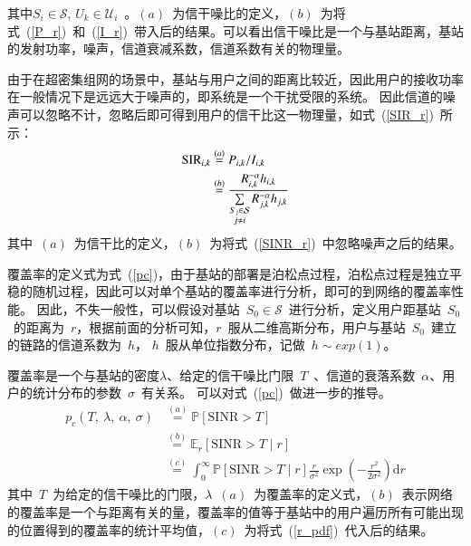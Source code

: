 其中$S_i\in\mathcal{S}$, $U_k\in\mathcal{U}_i$~。$(a)$~为信干噪比的定义，$(b)$~为将式~(\ref{P_r})~和~(\ref{I_r})~带入后的结果。可以看出信干噪比是一个与基站距离，基站的发射功率，噪声，信道衰减系数，信道系数有关的物理量。

由于在超密集组网的场景中，基站与用户之间的距离比较近，因此用户的接收功率在一般情况下是远远大于噪声的，即系统是一个干扰受限的系统。
因此信道的噪声可以忽略不计，忽略后即可得到用户的信干比这一物理量，如式~(\ref{SIR_r})~所示：
\begin{equation}\label{SIR_r}
  \begin{aligned}
    \mathrm{SIR}_{i, k}&\overset{(a)}{=}P_{i,k} / I_{i,k} \\
                 &\overset{(b)}{=}\frac{R_{i,k}^{-\alpha} h_{i,k}}{\sum\limits_{\begin{subarray}{c} S_j\in \mathcal{S}\\ j \neq i\end{subarray}} {R_{j,k}^{-\alpha} h_{j,k}}}
  \end{aligned}
\end{equation}
其中~$(a)$~为信干比的定义，$(b)$~为将式~(\ref{SINR_r})~中忽略噪声之后的结果。


覆盖率的定义式为式~(\ref{pc})，由于基站的部署是泊松点过程，泊松点过程是独立平稳的随机过程，因此可以对单个基站的覆盖率进行分析，即可的到网络的覆盖率性能。
因此，不失一般性，可以假设对基站~$S_0\in\mathcal{S}$~进行分析，定义用户距基站~$S_0$~的距离为~$r$，根据前面的分析可知，$r$~服从二维高斯分布，用户与基站~$S_0$~建立的链路的信道系数为~$h$，
$h$~服从单位指数分布，记做~$h\sim exp(1)$。

覆盖率是一个与基站的密度$\lambda$、给定的信干噪比门限~$T$~、信道的衰落系数~$\alpha$、用户的统计分布的参数~$\sigma$~有关系。
可以对式~(\ref{pc})~做进一步的推导。
\begin{equation}\label{pc_expand}
  \begin{aligned}
    p_c(T,~\lambda,~\alpha,~\sigma) &\overset{(a)}{=} \mathbb{P}[\mathrm{SINR}>T] \\
           &\overset{(b)}{=} \mathbb{E}_r[\mathrm{SINR}>T\mid r] \\
           &\overset{(c)}{=} \int_0^\infty \mathbb{P}[\mathrm{SINR}>T\mid r] \frac{r}{\sigma^2}\exp(-\frac{r^2}{2\sigma^2}) \mathrm{d} r
  \end{aligned}
\end{equation}
其中~$T$~为给定的信干噪比的门限，$\lambda$~$(a)$~为覆盖率的定义式，$(b)$~表示网络的覆盖率是一个与距离有关的量，覆盖率的值等于基站中的用户遍历所有可能出现的位置得到的覆盖率的统计平均值，$(c)$~为将式~(\ref{r_pdf})~代入后的结果。

